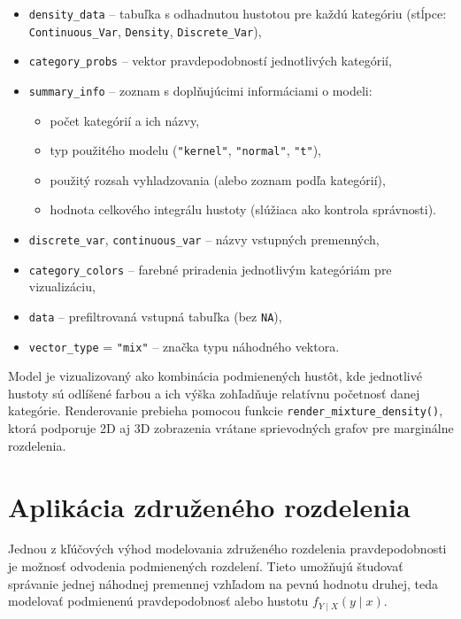 \begin{itemize}
\setlength{\itemsep}{0pt}
  \setlength{\parskip}{0pt}
  \item \texttt{density\_data} – tabuľka s odhadnutou hustotou pre každú kategóriu (stĺpce: \texttt{Continuous\_Var}, \texttt{Density}, \texttt{Discrete\_Var}),
  \item \texttt{category\_probs} – vektor pravdepodobností jednotlivých kategórií,
  \item \texttt{summary\_info} – zoznam s doplňujúcimi informáciami o modeli:
    \begin{itemize}
    \setlength{\itemsep}{0pt}
  \setlength{\parskip}{0pt}
      \item počet kategórií a ich názvy,
      \item typ použitého modelu (\texttt{"kernel"}, \texttt{"normal"}, \texttt{"t"}),
      \item použitý rozsah vyhladzovania (alebo zoznam podľa kategórií),
      \item hodnota celkového integrálu hustoty (slúžiaca ako kontrola správnosti).
    \end{itemize}
  \item \texttt{discrete\_var}, \texttt{continuous\_var} – názvy vstupných premenných,
  \item \texttt{category\_colors} – farebné priradenia jednotlivým kategóriám pre vizualizáciu,
  \item \texttt{data} – prefiltrovaná vstupná tabuľka (bez \texttt{NA}),
  \item \texttt{vector\_type} = \texttt{"mix"} – značka typu náhodného vektora.
\end{itemize}

Model je vizualizovaný ako kombinácia podmienených hustôt, kde jednotlivé hustoty sú odlíšené farbou a ich výška zohľadňuje relatívnu početnosť danej kategórie. Renderovanie prebieha pomocou funkcie \texttt{render\_mixture\_density()}, ktorá podporuje 2D aj 3D zobrazenia vrátane sprievodných grafov pre marginálne rozdelenia.

\section{Aplikácia združeného rozdelenia}\label{sec:app_joint_dist}

Jednou z kľúčových výhod modelovania združeného rozdelenia pravdepodobnosti je možnosť odvodenia podmienených rozdelení. Tieto umožňujú študovať správanie jednej náhodnej premennej vzhľadom na pevnú hodnotu druhej, teda modelovať podmienenú pravdepodobnosť alebo hustotu $f_{Y \mid X}(y \mid x)$.

